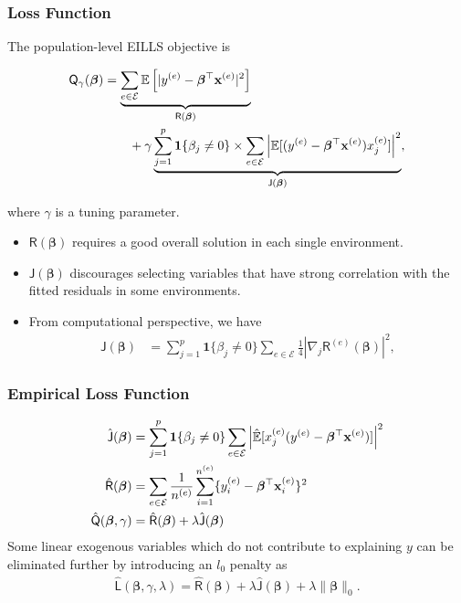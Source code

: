 \begin{frame}
  \frametitle{Loss Function}
  The population-level EILLS objective is 
  \begin{scriptsize}
  \begin{align}
    \mathsf{Q}_\gamma(\bm\beta) &= \underbrace{\sum_{e\in \mathcal{E}} \mathbb{E} \left[|y^{(e)} - \bm\beta^\top \mathbf x^{(e)}|^2\right]}_{\mathsf{R}(\bm\beta)} \nonumber\\
                                &\qquad + \gamma \underbrace{\sum_{j=1}^p \mathbf{1}\{\beta_j\neq 0\} \times  \sum_{e\in \mathcal{E}}  \left|\mathbb{E} [(y^{(e)} - \bm\beta^\top \mathbf x^{(e)}) x_j^{(e)}]\right|^2}_{\mathsf{J}(\bm\beta)},
  \end{align}
  \end{scriptsize}
  where $\gamma$ is a tuning parameter.
  \begin{itemize}
  \item $\mathsf R(\bm\beta)$ requires a good overall solution in each single environment.
  \item $\mathsf J(\bm\beta)$ discourages selecting variables that have strong correlation with the fitted residuals in some environments.
  \item From computational perspective, we have
    \begin{align}
    \mathsf{J}(\bm \beta) &= \sum_{j=1}^p \mathbf{1}\{\beta_j \neq 0\} \sum_{e\in \mathcal{E}} \frac{1}{4} |\nabla_j \mathsf{R}^{(e)}(\bm\beta)|^2,
  \end{align}
  \end{itemize}
\end{frame}

\begin{frame}
  \frametitle{Empirical Loss Function}
  \begin{align*}
    \hat{\mathsf{J}}(\bm\beta) &= \sum_{j=1}^p \mathbf{1}\{\beta_j \neq 0\} \sum_{e\in \mathcal{E}}  \left| \hat{\mathbb{E}}[x_j^{(e)} (y^{(e)} - \bm\beta^\top \mathbf x^{(e)})]\right|^2\\
    \hat{\mathsf{R}}(\bm\beta)& = \sum_{e\in \mathcal{E}}  \frac{1}{n^{(e)}} \sum_{i=1}^{n^{(e)}} \{ y^{(e)}_i - \bm\beta^\top \mathbf x^{(e)}_i \}^2\\
    \hat{\mathsf{Q}}(\bm\beta,\gamma) &= \hat{\mathsf{R}}(\bm\beta) + \lambda \hat{\mathsf{J}}(\bm\beta)
  \end{align*}
  Some linear exogenous variables which do not contribute to explaining $y$ can
  be eliminated further by introducing an $l_0$ penalty as
    \begin{align*}
   \hat{\mathsf{L}}(\bm\beta,\gamma,\lambda) =  \hat{\mathsf{R}}(\bm\beta) + \lambda \hat{\mathsf{J}}(\bm\beta) + \lambda \|\bm\beta\|_0.
  \end{align*}
\end{frame}

